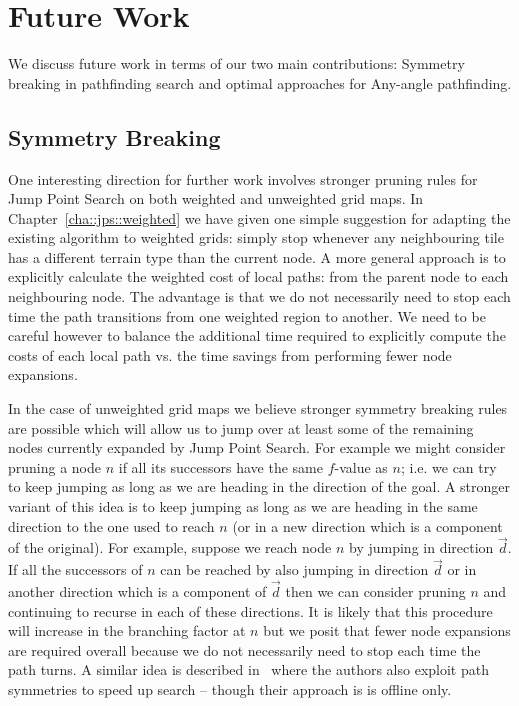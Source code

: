\section{Future Work}
\label{cha::conclusion::future}
We discuss future work in terms of our two main contributions: Symmetry breaking
in pathfinding search and optimal approaches for Any-angle pathfinding.

\subsection{Symmetry Breaking}
One interesting direction for further work involves stronger pruning rules for
Jump Point Search on both weighted and unweighted grid maps.  In
Chapter~\ref{cha::jps::weighted} we have given one simple suggestion for
adapting the existing algorithm to weighted grids: simply stop whenever any
neighbouring tile has a different terrain type than the current node.  A more
general approach is to explicitly calculate the weighted cost of local paths:
from the parent node to each neighbouring node.  The advantage is that we do
not necessarily need to stop each time the path transitions from one weighted
region to another. We need to be careful however to balance the additional
time required to explicitly compute the costs of each local path vs. the time
savings from performing fewer node expansions.

In the case of unweighted grid maps we believe stronger symmetry breaking
rules are possible which will allow us to jump over at least some of the
remaining nodes currently expanded by Jump Point Search. For example we might
consider pruning a node $n$ if all its successors have the same $f$-value as
$n$; i.e.  we can try to keep jumping as long as we are heading in the
direction of the goal.  A stronger variant of this idea is to keep jumping as
long as we are heading in the same direction to the one used to reach $n$ 
(or in a new direction which is a component of the original). For example,
suppose we reach node $n$ by jumping in direction $\vec{d}$.  If all the
successors of $n$ can be reached by also jumping in direction $\vec{d}$ or in
another direction which is a component of $\vec{d}$ then we can consider
pruning $n$ and continuing to recurse in each of these directions. It is
likely that this procedure will increase in the branching factor at $n$ but we
posit that fewer node expansions are required overall because we do not
necessarily need to stop each time the path turns.  A similar idea is
described in~\citep{urasKH13} where the authors also exploit path symmetries
to speed up search -- though their approach is is offline only.

